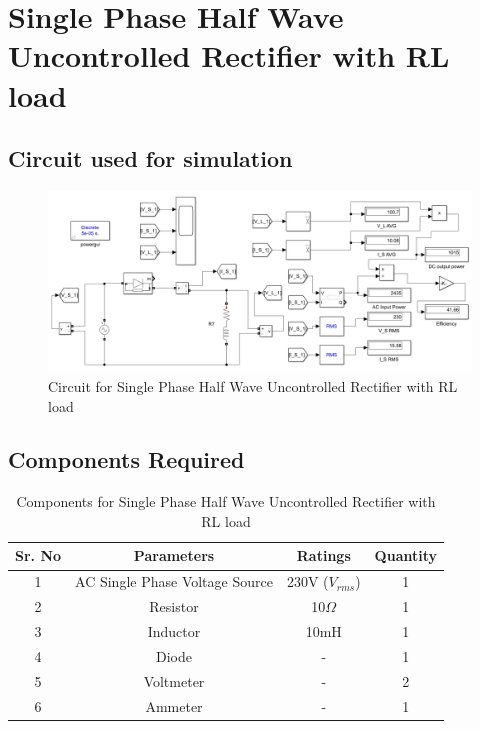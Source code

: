 \section{Single Phase Half Wave Uncontrolled Rectifier with RL load}

\subsection{Circuit used for simulation}

\begin{figure}[h]
    \centering
    \includegraphics[width=1.0\textwidth]{images/experiment-1/circuit-diagram-experiment-02.png}
    \caption{Circuit for Single Phase Half Wave Uncontrolled Rectifier with RL load}
    \label{Fig_simulation_circuit_single-phase-half-wave-uncontrolled-rectifier-with-RL-load}
\end{figure}

\subsection{Components Required}

\begin{table}[h]
    \renewcommand{\arraystretch}{1.3}
    \label{table_components_required_single-phase-half-wave-uncontrolled-rectifier-with-RL-load}
    \centering
    \begin{tabular}{|c|c|c|c|}
        \hline
        Sr. No & Parameters                     & Ratings            & Quantity \\
        \hline
        \hline
        1      & AC Single Phase Voltage Source & 230V ($ V_{rms} $) & 1        \\
        \hline
        2      & Resistor                       & 10$ \Omega $       & 1        \\
        \hline
        3      & Inductor                       & 10mH               & 1        \\
        \hline
        4      & Diode                          & -                  & 1        \\
        \hline
        5      & Voltmeter                      & -                  & 2        \\
        \hline
        6      & Ammeter                        & -                  & 1        \\
        \hline
    \end{tabular}
    \caption{Components for Single Phase Half Wave Uncontrolled Rectifier with RL load}
\end{table}


